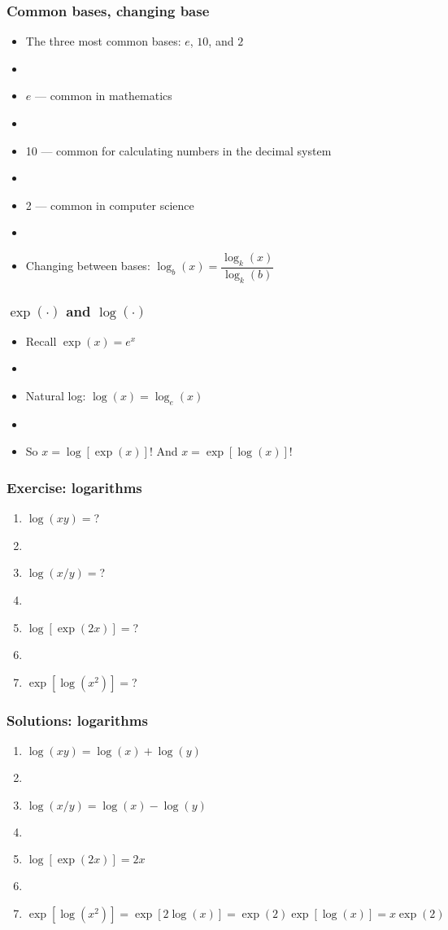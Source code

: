 \documentclass[12pt]{beamer}
\newcommand{\myframe}[1]{\begin{frame} \frametitle{#1}}
\begin{document}
\myframe{Common bases, changing base}
\begin{itemize}
\item The three most common bases: $e$, $10$, and $2$
\item[]
\item $e$ --- common in mathematics
\item[]
\item 10 --- common for calculating numbers in the decimal system
\item[]
\item 2 --- common in computer science
\item[]
\item Changing between bases: $\log_b(x) = \dfrac{\log_k(x)}{\log_k(b)}$
\end{itemize}
\end{frame}

\myframe{$\exp(\cdot)$ and $\log(\cdot)$}
\begin{itemize}
\item Recall $\exp(x) = e^x$
\item[]
\item Natural log: $\log (x) = \log_e(x)$
\item[]
\item So $x = \log [\exp(x)]$! And $x = \exp[\log(x)]$!
\end{itemize}
\end{frame}

\myframe{Exercise: logarithms}
\begin{enumerate}
\item $\log(xy) = $?
\item[]
\item $\log(x/y) = $?
\item[]
\item $\log[\exp(2x)] = $?
\item[]
\item $\exp[\log(x^2)] = $?
\end{enumerate}
\end{frame}

\myframe{Solutions: logarithms}
\begin{enumerate}
\item $\log(xy) = \log(x) + \log(y)$
\item[]
\item $\log(x/y) = \log(x) - \log(y)$
\item[]
\item $\log[\exp(2x)] = 2x$
\item[]
\item $\exp[\log(x^2)] = \exp[2\log(x)] = \exp(2)\exp[\log(x)] = x\exp(2)$
\end{enumerate}
\end{frame}
\end{document}
